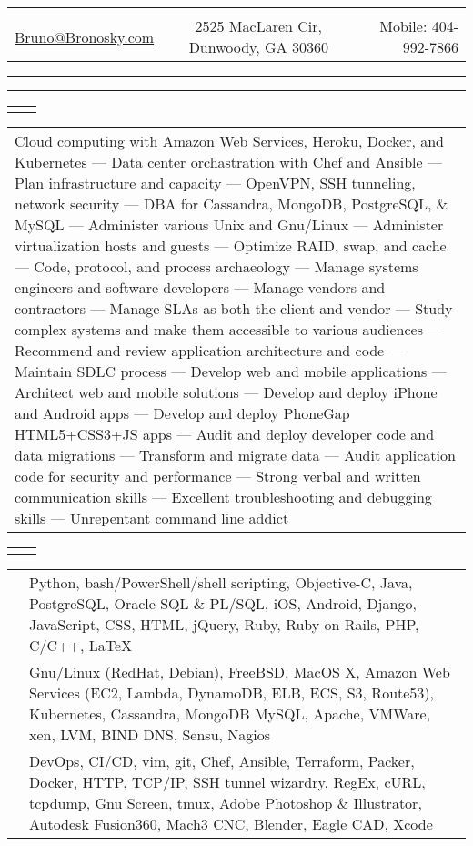 \documentclass[letterpaper,10pt]{article}
\newcommand{\lineDouble}[0]{\hrule\vspace{2pt}\hrule\vspace{1.5pt}}
\newcommand{\sizeE}[0]{\fontsize{10pt}{12pt}\selectfont}
\newcommand{\sizeF}[0]{\fontsize{11pt}{13pt}\selectfont}
\newcommand{\heading}[4]{
    \begin{tabularx}{\textwidth}{LCR}
        &\huge{\textbf{\sc{#1}}}&\\
        \href{mailto:#2}{#2} & #3 & Mobile: #4\\
    \end{tabularx}
    \lineDouble
    \vspace{5pt}%
}
\newcounter{skipfirstcounter}
\newcommand{\blocktitle}[1]{
    \setcounter{skipfirstcounter}{0}
    \begin{tabularx}{\textwidth}{lR}
        {\sizeF\sc{#1}} & \noindent\hrulefill\\
    \end{tabularx}
}
\newcommand{\blockOverview}[1]{%
    \blocktitle{Overview}%
    \vspace{0.4mm}%
    \begin{tabular*}{\textwidth}{p{\textwidth}}%
        #1%
    \end{tabular*}%
    \vspace{2mm}%
}%
\newcommand{\blockSkills}[1]{
    \blocktitle{Skills}
    \begin{tabular*}{\textwidth}{p{22mm}p{171.6mm}}%
        #1%
    \end{tabular*}%
    \vspace{2.4mm}%
}
\newcommand{\skillgroup}[2]{{\sizeE{#1}} & #2\\\addlinespace[1.6mm]}
\newcommand{\skillgrouplast}[2]{{\sizeE{#1}} & #2\\}
\begin{document}
\heading{Bruno Bronosky}
{Bruno@Bronosky.com}
{2525 MacLaren Cir, Dunwoody, GA 30360}
{404-992-7866}

\blockOverview{
    Cloud computing with Amazon Web Services, Heroku, Docker, and Kubernetes ---
    Data center orchastration with Chef and Ansible ---
    Plan infrastructure and capacity ---
    OpenVPN, SSH tunneling, network security ---
    DBA for Cassandra, MongoDB, PostgreSQL, \& MySQL ---
    Administer various Unix and Gnu/Linux ---
    Administer virtualization hosts and guests ---
    Optimize RAID, swap, and cache ---
    Code, protocol, and process archaeology ---
    Manage systems engineers and software developers ---
    Manage vendors and contractors ---
    Manage SLAs as both the client and vendor ---
    Study complex systems and make them accessible to various audiences ---
    Recommend and review application architecture and code ---
    Maintain SDLC process ---
    Develop web and mobile applications ---
    Architect web and mobile solutions ---
    Develop and deploy iPhone and Android apps ---
    Develop and deploy PhoneGap HTML5+CSS3+JS apps ---
    Audit and deploy developer code and data migrations ---
    Transform and migrate data ---
    Audit application code for security and performance ---
    Strong verbal and written communication skills ---
    Excellent troubleshooting and debugging skills ---
    Unrepentant command line addict
}

\blockSkills{
    \skillgroup{Development}{
        Python,
        bash/PowerShell/shell scripting,
        Objective-C,
        Java,
        PostgreSQL,
        Oracle SQL \& PL/SQL,
        iOS,
        Android,
        Django,
        JavaScript,
        CSS,
        HTML,
        jQuery,
        Ruby,
        Ruby on Rails,
        PHP,
        C/C++,
        \LaTeX
    }

    \skillgroup{Operations}{
        Gnu/Linux (RedHat, Debian),
        FreeBSD,
        MacOS X,
        Amazon Web Services (EC2, Lambda, DynamoDB, ELB, ECS, S3, Route53),
        Kubernetes,
        Cassandra,
        MongoDB
        MySQL,
        Apache,
        VMWare,
        xen,
        LVM,
        BIND DNS,
        Sensu,
        Nagios
    }

    \skillgrouplast{Concepts}{
        DevOps,
        CI/CD,
        vim,
        git,
        Chef,
        Ansible,
        Terraform,
        Packer,
        Docker,
        HTTP,
        TCP/IP,
        SSH tunnel wizardry,
        RegEx,
        cURL,
        tcpdump,
        Gnu Screen,
        tmux,
        Adobe Photoshop \& Illustrator,
        Autodesk Fusion360,
        Mach3 CNC,
        Blender,
        Eagle CAD,
        Xcode
    }
}
\end{document}
